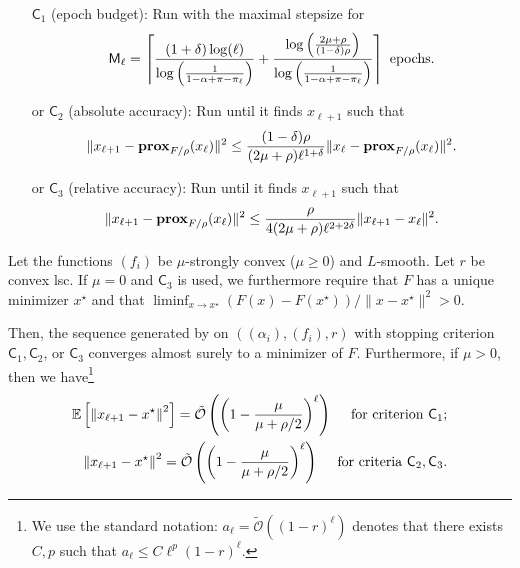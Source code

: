 \begin{algorithm}[h!]
{\begin{itemize}
    \item[] $\mathsf{C}_1$ (epoch budget): Run \salgo with the maximal stepsize for
    $$  \displaystyle \mathsf{M}_\ell = \left\lceil \frac{ (1+\delta) \log(\ell)}{\log\left( \frac{1}{1-\alpha+\pi - \pi_\ell} \right)} + \frac{\log\left(\frac{2 \mu+\rho}{(1-\delta)\rho}\right)}{\log\left( \frac{1}{1-\alpha+\pi - \pi_\ell} \right)} \right\rceil \text{ epochs.}$$
    \item[or] $\mathsf{C}_2$ (absolute accuracy):  Run \salgo until it finds $x_{\ell+1}$ such that  
    $$  \|x_{\ell+1} -  \mathbf{prox}_{F/\rho}(x_\ell)\|^2 \leq \frac{(1-\delta)\rho}{(2\mu+\rho) \ell^{1+\delta}} \|x_{\ell} -  \mathbf{prox}_{F/\rho}(x_\ell)\|^2  .$$ 
    \item[or] $\mathsf{C}_3$ (relative accuracy):  Run \salgo until it finds $x_{\ell+1}$ such that  
    $$  \|x_{\ell+1} -  \mathbf{prox}_{F/\rho}(x_\ell)\|^2 \leq \frac{\rho}{4(2\mu+\rho) \ell^{2+2\delta}} \|x_{\ell+1} -  x_\ell \|^2  .$$ 
\end{itemize}
}
\end{algorithm}



\begin{theorem} 
\label{th:reco}
Let the functions $(f_i)$ be $\mu$-strongly convex ($\mu\geq0$) and $L$-smooth. Let $r$ be convex lsc. If $\mu=0$ and $\mathsf{C}_3$ is used, we furthermore require that $F$ has a unique minimizer $x^\star$ and that $\liminf_{x\to x^\star} (F(x)-F(x^\star))/\|x-x^\star\|^2 > 0$.

Then, the sequence generated by \recoalgo on $((\alpha_i),(f_i),r)$ with stopping criterion $\mathsf{C}_1, \mathsf{C}_2$, or $\mathsf{C}_3$ converges almost surely to a minimizer of $F$.
Furthermore, if $\mu>0$, then we have\footnote{We use the standard notation: $a_\ell = \tilde{\mathcal{O}} ( (1-r)^\ell)$ denotes that there exists $C,p$ such that $ a_\ell \leq C \ell^p (1-r)^\ell $. } 
      \begin{align*}
        \mathbb{E} \left[   \left\|x_{\ell+1} - x^\star  \right\|^2 \right] = \tilde{\mathcal{O}} \left( \left( 1 - \frac{{\mu }}{\mu + {\rho }/2} \right)^\ell \right) \quad\text{ for criterion } \mathsf{C}_1; \\
      \left\|x_{\ell+1} - x^\star  \right\|^2  = \tilde{\mathcal{O}} \left( \left( 1 - \frac{{\mu }}{\mu + {\rho }/2}  \right)^\ell \right)  \quad\text{ for criteria } \mathsf{C}_2, \mathsf{C}_3.
        \end{align*}
\end{theorem}

